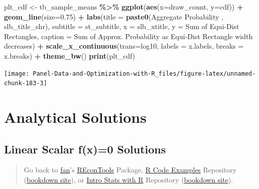 \documentclass[
]{book}
\newenvironment{Shaded}{\begin{snugshade}}{\end{snugshade}}
\newcommand{\DataTypeTok}[1]{\textcolor[rgb]{0.13,0.29,0.53}{#1}}
\newcommand{\FloatTok}[1]{\textcolor[rgb]{0.00,0.00,0.81}{#1}}
\newcommand{\KeywordTok}[1]{\textcolor[rgb]{0.13,0.29,0.53}{\textbf{#1}}}
\newcommand{\NormalTok}[1]{#1}
\newcommand{\OperatorTok}[1]{\textcolor[rgb]{0.81,0.36,0.00}{\textbf{#1}}}
\newcommand{\StringTok}[1]{\textcolor[rgb]{0.31,0.60,0.02}{#1}}
\begin{document}
\begin{Shaded}
\begin{Highlighting}[]
\NormalTok{plt\_cdf \textless{}{-}}\StringTok{ }\NormalTok{tb\_sample\_means }\OperatorTok{\%\textgreater{}\%}
\StringTok{  }\KeywordTok{ggplot}\NormalTok{(}\KeywordTok{aes}\NormalTok{(}\DataTypeTok{x=}\NormalTok{draw\_count, }\DataTypeTok{y=}\NormalTok{cdf)) }\OperatorTok{+}
\StringTok{  }\KeywordTok{geom\_line}\NormalTok{(}\DataTypeTok{size=}\FloatTok{0.75}\NormalTok{) }\OperatorTok{+}
\StringTok{  }\KeywordTok{labs}\NormalTok{(}\DataTypeTok{title =} \KeywordTok{paste0}\NormalTok{(}\StringTok{\textquotesingle{}Aggregate Probability \textquotesingle{}}\NormalTok{, slb\_title\_shr),}
       \DataTypeTok{subtitle =}\NormalTok{ st\_subtitle,}
       \DataTypeTok{x =}\NormalTok{ slb\_xtitle,}
       \DataTypeTok{y =} \StringTok{\textquotesingle{}Sum of Equi{-}Dist Rectangles\textquotesingle{}}\NormalTok{,}
       \DataTypeTok{caption =} \StringTok{\textquotesingle{}Sum of Approx. Probability as Equi{-}Dist Rectangle width decreases\textquotesingle{}}\NormalTok{) }\OperatorTok{+}
\StringTok{  }\KeywordTok{scale\_x\_continuous}\NormalTok{(}\DataTypeTok{trans=}\StringTok{\textquotesingle{}log10\textquotesingle{}}\NormalTok{, }\DataTypeTok{labels =}\NormalTok{ x.labels, }\DataTypeTok{breaks =}\NormalTok{ x.breaks) }\OperatorTok{+}
\StringTok{  }\KeywordTok{theme\_bw}\NormalTok{()}
\KeywordTok{print}\NormalTok{(plt\_cdf)}
\end{Highlighting}
\end{Shaded}

\begin{center}\texttt{[image: Panel-Data-and-Optimization-with-R\_files/figure-latex/unnamed-chunk-183-3]} \end{center}

\hypertarget{analytical-solutions}{%
\section{Analytical Solutions}\label{analytical-solutions}}

\hypertarget{linear-scalar-fx0-solutions}{%
\subsection{Linear Scalar f(x)=0 Solutions}\label{linear-scalar-fx0-solutions}}

\begin{quote}
Go back to \href{http://fanwangecon.github.io/}{fan}'s \href{https://fanwangecon.github.io/REconTools/}{REconTools} Package, \href{https://fanwangecon.github.io/R4Econ/}{R Code Examples} Repository (\href{https://fanwangecon.github.io/R4Econ/bookdown}{bookdown site}), or \href{https://fanwangecon.github.io/Stat4Econ/}{Intro Stats with R} Repository (\href{https://fanwangecon.github.io/Stat4Econ/bookdown}{bookdown site}).
\end{quote}
\end{document}
